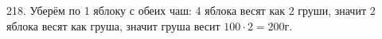 218. Уберём по 1 яблоку с обеих чаш: 4 яблока весят как 2 груши, значит 2 яблока весят как груша, значит груша весит $100\cdot2=200$г.\\
